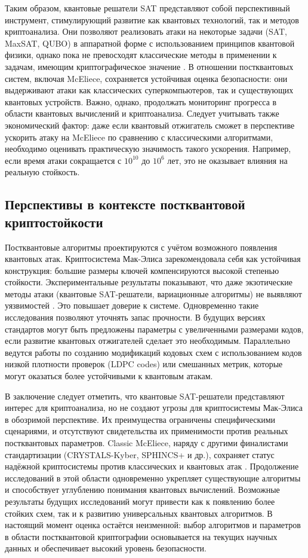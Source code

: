 Таким образом, квантовые решатели SAT представляют собой перспективный инструмент, стимулирующий развитие как квантовых технологий, так и методов криптоанализа. Они позволяют реализовать атаки на некоторые задачи (SAT, MaxSAT, QUBO) в аппаратной форме с использованием принципов квантовой физики, однако пока не превосходят классические методы в применении к задачам, имеющим криптографическое значение \cite{Shintaro2024,Im2025}. В отношении постквантовых систем, включая McEliece, сохраняется устойчивая оценка безопасности: они выдерживают атаки как классических суперкомпьютеров, так и существующих квантовых устройств. Важно, однако, продолжать мониторинг прогресса в области квантовых вычислений и криптоанализа. Следует учитывать также экономический фактор: даже если квантовый отжигатель сможет в перспективе ускорить атаку на McEliece по сравнению с классическими алгоритмами, необходимо оценивать практическую значимость такого ускорения. Например, если время атаки сокращается с $10^{10}$ до $10^{6}$ лет, это не оказывает влияния на реальную стойкость.

\subsection*{Перспективы в контексте постквантовой криптостойкости}
Постквантовые алгоритмы проектируются с учётом возможного появления квантовых атак. Криптосистема Мак-Элиса зарекомендовала себя как устойчивая конструкция: большие размеры ключей компенсируются высокой степенью стойкости. Экспериментальные результаты показывают, что даже экзотические методы атаки (квантовые SAT-решатели, вариационные алгоритмы) не выявляют уязвимостей \cite{Pei2025,Sirdey2023}. Это повышает доверие к системе. Одновременно такие исследования позволяют уточнять запас прочности. В будущих версиях стандартов могут быть предложены параметры с увеличенными размерами кодов, если развитие квантовых отжигателей сделает это необходимым. Параллельно ведутся работы по созданию модификаций кодовых схем с использованием кодов низкой плотности проверок (LDPC codes) или смешанных метрик, которые могут оказаться более устойчивыми к квантовым атакам.

В заключение следует отметить, что квантовые SAT-решатели представляют интерес для криптоанализа, но не создают угрозы для криптосистемы Мак-Элиса в обозримой перспективе. Их преимущества ограничены специфическими сценариями, и отсутствуют свидетельства их применимости против реальных постквантовых параметров. Classic McEliece, наряду с другими финалистами стандартизации (CRYSTALS-Kyber, SPHINCS+ и др.), сохраняет статус надёжной криптосистемы против классических и квантовых атак \cite{ClassicMcEliece2020}. Продолжение исследований в этой области одновременно укрепляет существующие алгоритмы и способствует углублению понимания квантовых вычислений. Возможные результаты будущих исследований могут привести как к появлению более стойких схем, так и к развитию универсальных квантовых алгоритмов. В настоящий момент оценка остаётся неизменной: выбор алгоритмов и параметров в области постквантовой криптографии основывается на текущих научных данных и обеспечивает высокий уровень безопасности.
